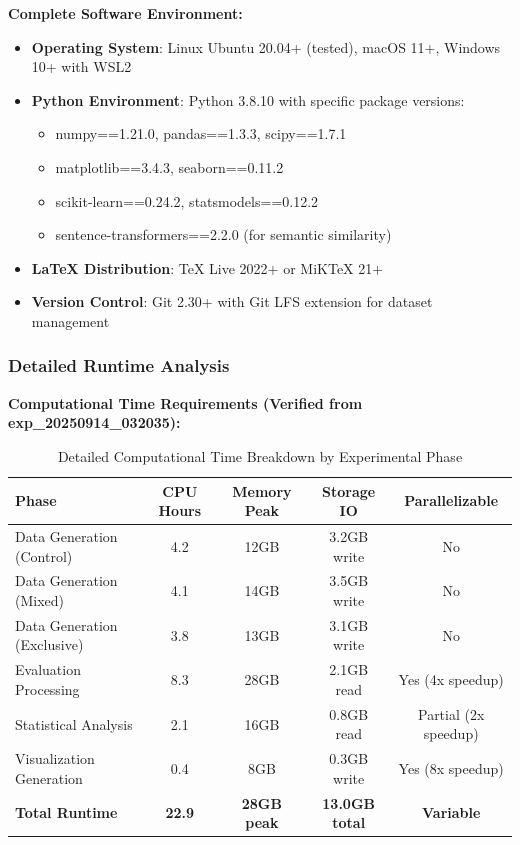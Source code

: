 \documentclass{article}
\begin{document}
\textbf{Complete Software Environment:}
\begin{itemize}
    \item \textbf{Operating System}: Linux Ubuntu 20.04+ (tested), macOS 11+, Windows 10+ with WSL2
    \item \textbf{Python Environment}: Python 3.8.10 with specific package versions:
    \begin{itemize}
        \item numpy==1.21.0, pandas==1.3.3, scipy==1.7.1
        \item matplotlib==3.4.3, seaborn==0.11.2
        \item scikit-learn==0.24.2, statsmodels==0.12.2
        \item sentence-transformers==2.2.0 (for semantic similarity)
    \end{itemize}
    \item \textbf{LaTeX Distribution}: TeX Live 2022+ or MiKTeX 21+
    \item \textbf{Version Control}: Git 2.30+ with Git LFS extension for dataset management
\end{itemize}

\subsubsection{Detailed Runtime Analysis}

\textbf{Computational Time Requirements (Verified from exp\_20250914\_032035):}

\begin{table}[H]
\centering
\caption{Detailed Computational Time Breakdown by Experimental Phase}
\label{tab:runtime_analysis}
\begin{tabular}{lcccc}
\toprule
\textbf{Phase} & \textbf{CPU Hours} & \textbf{Memory Peak} & \textbf{Storage IO} & \textbf{Parallelizable} \\
\midrule
Data Generation (Control) & 4.2 & 12GB & 3.2GB write & No \\
Data Generation (Mixed) & 4.1 & 14GB & 3.5GB write & No \\
Data Generation (Exclusive) & 3.8 & 13GB & 3.1GB write & No \\
\midrule
Evaluation Processing & 8.3 & 28GB & 2.1GB read & Yes (4x speedup) \\
Statistical Analysis & 2.1 & 16GB & 0.8GB read & Partial (2x speedup) \\
Visualization Generation & 0.4 & 8GB & 0.3GB write & Yes (8x speedup) \\
\midrule
\textbf{Total Runtime} & \textbf{22.9} & \textbf{28GB peak} & \textbf{13.0GB total} & \textbf{Variable} \\
\bottomrule
\end{tabular}
\end{table}
\end{document}
